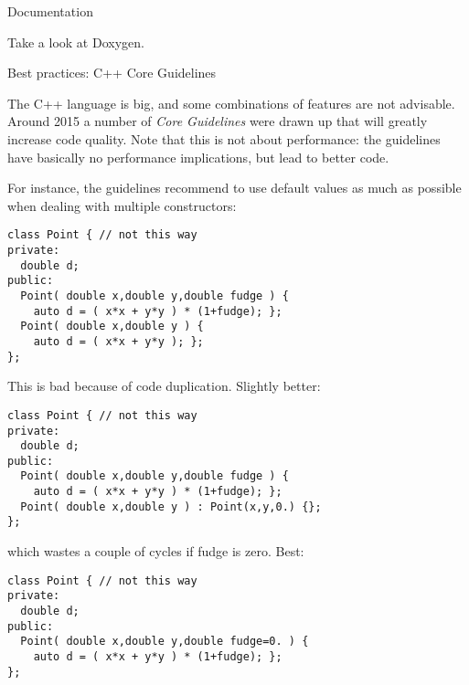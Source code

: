  {Documentation}

Take a look at Doxygen.

 {Best practices: C++ Core Guidelines}

The C++ language is big, and some combinations of features are not
advisable. Around 2015 a number of \emph{Core Guidelines} were drawn
up that will greatly increase code quality. Note that this is not
about performance: the guidelines have basically no performance
implications, but lead to better code.

For instance, the guidelines recommend to use default values as much
as possible when dealing with multiple constructors:
\begin{lstlisting}
class Point { // not this way
private:
  double d;
public:
  Point( double x,double y,double fudge ) {
    auto d = ( x*x + y*y ) * (1+fudge); };
  Point( double x,double y ) {
    auto d = ( x*x + y*y ); };
};
\end{lstlisting}
This is bad because of code duplication. Slightly better:
\begin{lstlisting}
class Point { // not this way
private:
  double d;
public:
  Point( double x,double y,double fudge ) {
    auto d = ( x*x + y*y ) * (1+fudge); };
  Point( double x,double y ) : Point(x,y,0.) {};
};
\end{lstlisting}
which wastes a couple of cycles if fudge is zero.
Best:
\begin{lstlisting}
class Point { // not this way
private:
  double d;
public:
  Point( double x,double y,double fudge=0. ) {
    auto d = ( x*x + y*y ) * (1+fudge); };
};
\end{lstlisting}


